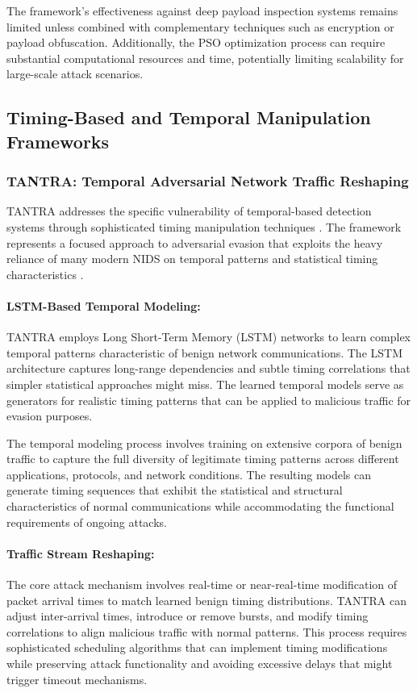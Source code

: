 The framework's effectiveness against deep payload inspection systems remains limited unless combined with complementary techniques such as encryption or payload obfuscation. Additionally, the PSO optimization process can require substantial computational resources and time, potentially limiting scalability for large-scale attack scenarios.

\subsection{Timing-Based and Temporal Manipulation Frameworks}

\subsubsection{TANTRA: Temporal Adversarial Network Traffic Reshaping}

TANTRA addresses the specific vulnerability of temporal-based detection systems through sophisticated timing manipulation techniques \cite{han2021evaluating}. The framework represents a focused approach to adversarial evasion that exploits the heavy reliance of many modern NIDS on temporal patterns and statistical timing characteristics \cite{han2021evaluating}.

\paragraph{LSTM-Based Temporal Modeling:}
TANTRA employs Long Short-Term Memory (LSTM) networks to learn complex temporal patterns characteristic of benign network communications. The LSTM architecture captures long-range dependencies and subtle timing correlations that simpler statistical approaches might miss. The learned temporal models serve as generators for realistic timing patterns that can be applied to malicious traffic for evasion purposes.

The temporal modeling process involves training on extensive corpora of benign traffic to capture the full diversity of legitimate timing patterns across different applications, protocols, and network conditions. The resulting models can generate timing sequences that exhibit the statistical and structural characteristics of normal communications while accommodating the functional requirements of ongoing attacks.

\paragraph{Traffic Stream Reshaping:}
The core attack mechanism involves real-time or near-real-time modification of packet arrival times to match learned benign timing distributions. TANTRA can adjust inter-arrival times, introduce or remove bursts, and modify timing correlations to align malicious traffic with normal patterns. This process requires sophisticated scheduling algorithms that can implement timing modifications while preserving attack functionality and avoiding excessive delays that might trigger timeout mechanisms.

